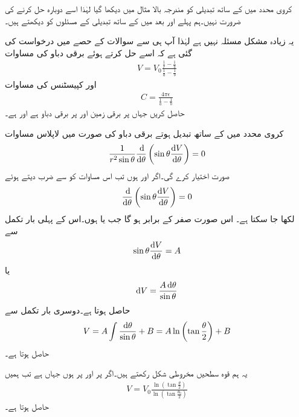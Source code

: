 کروی محدد میں  کے ساتھ تبدیلی کو مندرجہ بالا مثال میں دیکھا گیا لہٰذا اسے دوبارہ حل کرنے کی ضرورت نہیں۔ہم پہلے  اور بعد میں  کے ساتھ تبدیلی کے مسئلوں کو دیکھتے ہیں۔

یہ زیادہ مشکل مسئلہ نہیں ہے لہٰذا آپ ہی سے سوالات کے حصے میں درخواست کی گئی ہے کہ اسے حل کرتے ہوئے برقی دباو کی مساوات 
\begin{align}\label{مساوات_لاپلاس_کروی_رداسی_لاپلاسی_دباو}
V=V_0 \frac{\frac{1}{r}-\frac{1}{b}}{\frac{1}{a}-\frac{1}{b}}
\end{align}
اور کپیسٹنس کی مساوات 
\begin{align}\label{مساوات_لاپلاس_کروی_رداسی_لاپلاسی_کپیسٹنس}
C=\frac{4\pi \epsilon}{\frac{1}{a}-\frac{1}{b}}
\end{align}
حاصل کریں  جہاں  پر برقی زمین اور  پر  برقی دباو ہے اور  ہے۔

کروی محدد میں  کے ساتھ تبدیل ہوتے برقی دباو کی صورت میں لاپلاس مساوات
\begin{align}
\frac{1}{r^2 \sin \theta} \frac{\dif}{\dif \theta}\left(\sin \theta \frac{\dif V}{\dif \theta}\right)=0
\end{align}
صورت اختیار کرے گی۔اگر  اور  ہوں تب اس مساوات کو  سے ضرب دیتے ہوئے
\begin{align}
\frac{\dif}{\dif \theta}\left(\sin \theta \frac{\dif V}{\dif \theta}\right)=0
\end{align}
لکھا جا سکتا ہے۔ اس صورت صفر کے برابر ہو گا جب  یا  ہوں۔اس کے پہلی بار تکمل سے
\begin{align*}
\sin \theta \frac{\dif V}{\dif \theta}=A
\end{align*}
یا
\begin{align*}
\dif V=\frac{A \dif \theta}{\sin \theta}
\end{align*}
حاصل ہوتا ہے۔دوسری بار تکمل سے
\begin{align}\label{مساوات_لاپلاس_مخروطی_حل}
V=A\int \frac{\dif \theta}{\sin \theta}+B=A \ln \left(\tan \frac{\theta}{2}\right)+B
\end{align}
حاصل ہوتا ہے۔

یہ ہم قوہ سطحیں مخروطی شکل رکھتے ہیں۔اگر  پر  اور  پر  ہوں جہاں  ہے تب ہمیں
\begin{align}\label{مساوات_لاپلاس_مخروطی_حل_ب}
V=V_0 \frac{\ln \left(\tan \frac{\theta}{2} \right)}{\ln \left(\tan \frac{\theta_0}{2} \right)}
\end{align}
حاصل ہوتا ہے۔

